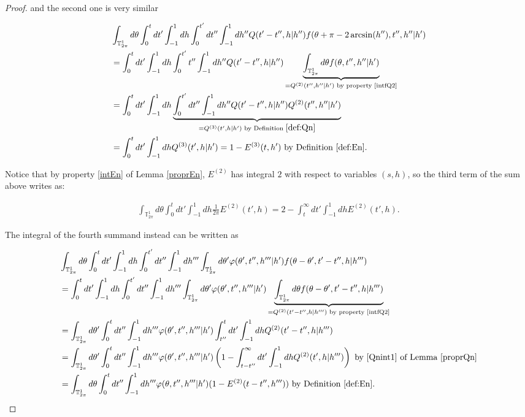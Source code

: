 \documentclass[a4paper,10pt,reqno]{amsart}
\numberwithin{equation}{subsection}
\numberwithin{figure}{subsection}
\begin{document}
\begin{proof}
and the second one is very similar

{\small\begin{align*}
&\int_{\mathbb{T}^1_{2\pi}}d\theta\int_0^tdt'\int_{-1}^1dh\int_0^{t'}dt''\int_{-1}^1dh''Q(t'-t'',h|h'')f(\theta+\pi-2\arcsin(h''),t'',h''|h')
\\
&=\int_0^tdt'\int_{-1}^1dh\int_0^{t'}t''\int_{-1}^1dh''Q(t'-t'',h|h'')\underbrace{\int_{\mathbb{T}^1_{2\pi}}d\theta f(\theta,t'',h''|h')}_{=Q^{(2)}(t'',h''|h')\textrm{ by property \eqref{intfQ2}}}
\\
&=\int_0^tdt'\int_{-1}^1dh\underbrace{\int_0^{t'}dt''\int_{-1}^1dh''Q(t'-t'',h|h'')Q^{(2)}(t'',h''|h')}_{=Q^{(3)}(t',h|h')\textrm{ by Definition }\ref{def:Qn}}
\\
&=\int_0^tdt'\int_{-1}^1dhQ^{(3)}(t',h|h')=1-E^{(3)}(t,h')\textrm{ by Definition }\ref{def:En}.
\end{align*}}

Notice that by property \eqref{intEn} of Lemma \ref{proprEn}, $E^{(2)}$ has integral $2$ with respect to variables $(s,h)$, so the third term of the sum above writes as:

\begin{align*}
\int_{\mathbb{T}^1_{2\pi}}d\theta\int_0^tdt'\int_{-1}^1dh\frac{1}{2\pi}E^{(2)}(t',h)=2-\int_t^{\infty}dt'\int_{-1}^1dhE^{(2)}(t',h).
\end{align*}

The integral of the fourth summand instead can be written as

{\tiny\begin{align*}
&\int_{\mathbb{T}^1_{2\pi}}d\theta\int_0^tdt'\int_{-1}^1dh\int_0^{t'}dt''\int_{-1}^1dh'''\int_{\mathbb{T}^1_{2\pi}}d\theta'\varphi(\theta',t'',h'''|h')f(\theta-\theta',t'-t'',h|h''')
\\
&=\int_0^tdt'\int_{-1}^1dh\int_0^{t'}dt''\int_{-1}^1dh'''\int_{\mathbb{T}^1_{2\pi}}d\theta'\varphi(\theta',t'',h'''|h')\underbrace{\int_{\mathbb{T}^1_{2\pi}}d\theta f(\theta-\theta',t'-t'',h|h''')}_{=Q^{(2)}(t'-t'',h|h''') \textrm{ by property \eqref{intfQ2}}}
\\
&=\int_{\mathbb{T}^1_{2\pi}}d\theta'\int_0^tdt''\int_{-1}^1dh'''\varphi(\theta',t'',h'''|h')\int_{t''}^tdt'\int_{-1}^1dhQ^{(2)}(t'-t'',h|h''')
\\
&=\int_{\mathbb{T}^1_{2\pi}}d\theta'\int_0^tdt''\int_{-1}^1dh'''\varphi(\theta',t'',h'''|h')\left(1-\int_{t-t''}^{\infty}dt'\int_{-1}^1dhQ^{(2)}(t',h|h''')\right)\textrm{ by \eqref{Qnint1} of Lemma \ref{proprQn}}
\\
&=\int_{\mathbb{T}^1_{2\pi}}d\theta\int_0^tdt''\int_{-1}^1dh'''\varphi(\theta,t'',h'''|h')(1-E^{(2)}(t-t'',h'''))\textrm{ by Definition \ref{def:En}}.
\end{align*}}


\end{proof}
\end{document}
